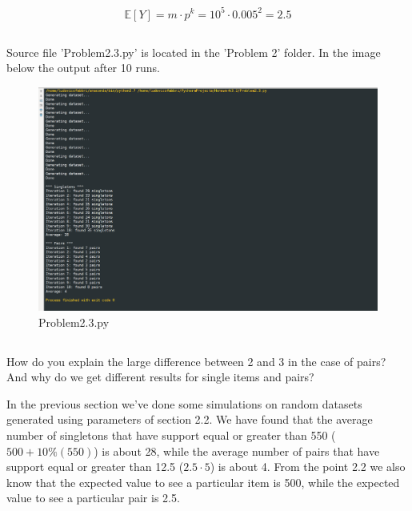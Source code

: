 \documentclass{article}
\begin{document}
$$  \mathbb{E}  \left[ Y \right] =  m \cdot p^k = 10^5 \cdot 0.005^2  = 2.5 $$





\subsection{}

Source file 'Problem2.3.py' is located in the 'Problem 2' folder. In the image below the output after 10 runs.

\begin{figure} [h]
\centering
\includegraphics[width=150mm]{problem23}
\caption{Problem2.3.py  \label{problem23}}
\end{figure}





\subsection{}
How do you explain the large difference between 2 and 3 in the case of pairs? And why do we get different results for single items and pairs?

In the previous section we've done some simulations on random datasets generated using parameters of section 2.2.
We have found that the average number of singletons that have support equal or greater than 550 ($500 + 10\%(550)$) is about 28, while the average number of pairs that have support equal or greater than 12.5 ($2.5 \cdot 5$)
is about 4. From the point 2.2 we also know that the expected value to see a particular item is 500, while the expected value to see a particular pair is 2.5.
\end{document}
